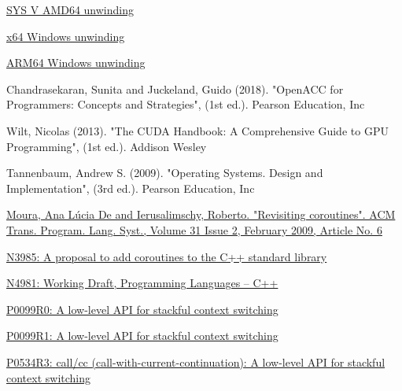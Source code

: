 \newpage
{}
\begin{thebibliography}{99}

        \href{https://software.intel.com/sites/default/files/article/402129/mpx-linux64-abi.pdf}{SYS V AMD64 unwinding}

        \href{https://docs.microsoft.com/en-us/cpp/build/exception-handling-x64?view=vs-2019}{x64 Windows unwinding}

        \href{https://docs.microsoft.com/en-us/cpp/build/arm64-exception-handling?view=vs-2019}{ARM64 Windows unwinding}

        {Chandrasekaran, Sunita and Juckeland, Guido (2018). "OpenACC for Programmers: Concepts and Strategies", (1st ed.).
         Pearson Education, Inc}

        {Wilt, Nicolas (2013). "The CUDA Handbook: A Comprehensive Guide to GPU Programming", (1st ed.).
         Addison Wesley}

        {Tannenbaum, Andrew S. (2009). "Operating Systems. Design and Implementation", (3rd ed.).
         Pearson Education, Inc}

        \href{http://www.inf.puc-rio.br/~roberto/docs/MCC15-04.pdf}
        {Moura, Ana L\'{u}cia De and Ierusalimschy, Roberto. "Revisiting coroutines".
         ACM Trans. Program. Lang. Syst., Volume 31 Issue 2, February 2009, Article No. 6}

        \href{http://isocpp.org/files/papers/n3985.pdf}
        {N3985: A proposal to add coroutines to the C++ standard library}

        \href{https://www.open-std.org/jtc1/sc22/wg21/docs/papers/2024/n4981.pdf}
        {N4981: Working Draft, Programming Languages -- C++}

        \href{http://www.open-std.org/jtc1/sc22/wg21/docs/papers/2015/p0099r0.pdf}
        {P0099R0: A low-level API for stackful context switching}

        \href{http://www.open-std.org/jtc1/sc22/wg21/docs/papers/2016/p0099r1.pdf}
        {P0099R1: A low-level API for stackful context switching}

        \href{http://www.open-std.org/jtc1/sc22/wg21/docs/papers/2017/p0534r3.pdf}
        {P0534R3: call/cc (call-with-current-continuation): A low-level API for stackful
        context switching}


\end{thebibliography}
